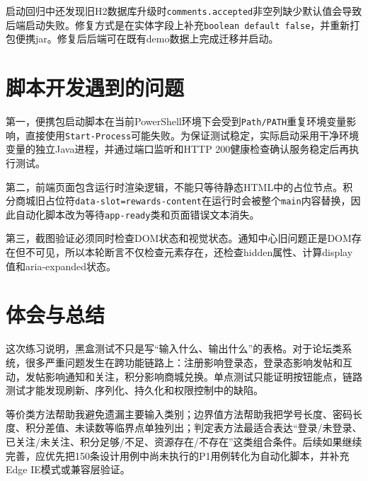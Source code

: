 \documentclass[UTF8,zihao=-4]{ctexart}
\begin{document}
启动回归中还发现旧H2数据库升级时\texttt{comments.accepted}非空列缺少默认值会导致后端启动失败。修复方式是在实体字段上补充\texttt{boolean default false}，并重新打包便携jar。修复后后端可在既有demo数据上完成迁移并启动。

\section{脚本开发遇到的问题}
第一，便携包启动脚本在当前PowerShell环境下会受到\texttt{Path/PATH}重复环境变量影响，直接使用\texttt{Start-Process}可能失败。为保证测试稳定，实际启动采用干净环境变量的独立Java进程，并通过端口监听和HTTP 200健康检查确认服务稳定后再执行测试。

第二，前端页面包含运行时渲染逻辑，不能只等待静态HTML中的占位节点。积分商城旧占位符\texttt{data-slot=rewards-content}在运行时会被整个\texttt{main}内容替换，因此自动化脚本改为等待\texttt{app-ready}类和页面错误文本消失。

第三，截图验证必须同时检查DOM状态和视觉状态。通知中心旧问题正是DOM存在但不可见，所以本轮断言不仅检查元素存在，还检查hidden属性、计算display值和aria-expanded状态。

\section{体会与总结}
这次练习说明，黑盒测试不只是写“输入什么、输出什么”的表格。对于论坛类系统，很多严重问题发生在跨功能链路上：注册影响登录态，登录态影响发帖和互动，发帖影响通知和关注，积分影响商城兑换。单点测试只能证明按钮能点，链路测试才能发现刷新、序列化、持久化和权限控制中的缺陷。

等价类方法帮助我避免遗漏主要输入类别；边界值方法帮助我把学号长度、密码长度、积分差值、未读数等临界点单独列出；判定表方法最适合表达“登录/未登录、已关注/未关注、积分足够/不足、资源存在/不存在”这类组合条件。后续如果继续完善，应优先把150条设计用例中尚未执行的P1用例转化为自动化脚本，并补充Edge IE模式或兼容层验证。
\end{document}
